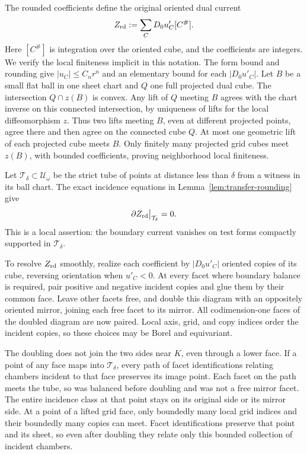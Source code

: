 The rounded coefficients define the original oriented dual current
\begin{equation}\label{eq:transfer-rounded-current}
                    Z_{\rm rd}:=\sum_C D_0u'_C[C^\#].
\end{equation}
Here \([C^\#]\) is integration over the oriented cube, and the
coefficients are integers.  We verify the local finiteness implicit
in this notation.  The form bound and rounding give
\(|u_C|\leq C_nr^n\) and an elementary bound for each \(|D_0u'_C|\).
Let \(B\) be a small flat ball in one sheet chart and \(Q\) one full
projected dual cube.  The intersection \(Q\cap z(B)\) is convex.  Any
lift of \(Q\) meeting \(B\) agrees with the chart inverse on this
connected intersection, by uniqueness of lifts for the local
diffeomorphism \(z\).  Thus two lifts meeting \(B\), even at different
projected points, agree there and then agree on the connected cube
\(Q\).  At most one geometric lift of each projected cube meets \(B\).
Only finitely many projected grid cubes meet \(z(B)\), with bounded
coefficients, proving neighborhood local finiteness.

Let \(\mathcal T_\delta\subset\mathcal U_\omega\) be the strict tube
of points at distance less than \(\delta\) from a witness in its ball
chart.  The exact incidence equations in
Lemma~\ref{lem:transfer-rounding} give
\begin{equation}\label{eq:transfer-current-closed}
                    \partial Z_{\rm rd}\big|_{\mathcal T_\delta}=0.
\end{equation}
This is a local assertion: the boundary current vanishes on test forms
compactly supported in \(\mathcal T_\delta\).

To resolve \(Z_{\rm rd}\) smoothly, realize each coefficient by
\(|D_0u'_C|\) oriented copies of its cube, reversing orientation when
\(u'_C<0\).  At every facet where boundary balance is required, pair
positive and negative incident copies and glue them by their common
face.  Leave other facets free, and double this diagram with an
oppositely oriented mirror, joining each free facet to its mirror.
All codimension-one faces of the doubled diagram are now paired.
Local axis, grid, and copy indices order the incident copies, so these
choices may be Borel and equivariant.

The doubling does not join the two sides near \(K\), even through a
lower face.  If a point of any face maps into \(\mathcal T_\delta\),
every path of facet identifications relating chambers incident to that
face preserves its image point.  Each facet on the path meets the tube,
so was balanced before doubling and was not a free mirror facet.  The
entire incidence class at that point stays on its original side or its
mirror side.  At a point of a lifted grid face, only boundedly many
local grid indices and their boundedly many copies can meet.  Facet
identifications preserve that point and its sheet, so even after
doubling they relate only this bounded collection of incident chambers.

